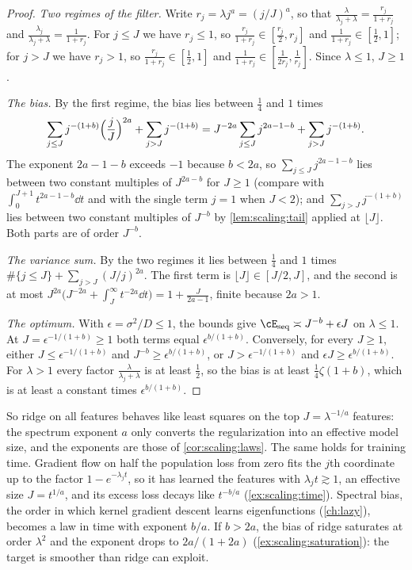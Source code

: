\begin{refsection}
\begin{proof}
\emph{Two regimes of the filter.} Write $r_j=\lambda j^a=(j/J)^a$, so that $\frac\lambda{\lambda_j+\lambda}=\frac{r_j}{1+r_j}$ and $\frac{\lambda_j}{\lambda_j+\lambda}=\frac1{1+r_j}$. For $j\le J$ we have $r_j\le1$, so $\frac{r_j}{1+r_j}\in[\frac{r_j}2,r_j]$ and $\frac1{1+r_j}\in[\frac12,1]$; for $j>J$ we have $r_j>1$, so $\frac{r_j}{1+r_j}\in[\frac12,1]$ and $\frac1{1+r_j}\in[\frac1{2r_j},\frac1{r_j}]$. Since $\lambda\le1$, $J\ge1$.

\emph{The bias.} By the first regime, the bias lies between $\frac14$ and $1$ times
\[
  \sum_{j\le J}j^{-(1+b)}\Bigl(\frac jJ\Bigr)^{2a}+\sum_{j>J}j^{-(1+b)}=J^{-2a}\sum_{j\le J}j^{2a-1-b}+\sum_{j>J}j^{-(1+b)} .
\]
The exponent $2a-1-b$ exceeds $-1$ because $b<2a$, so $\sum_{j\le J}j^{2a-1-b}$ lies between two constant multiples of $J^{2a-b}$ for $J\ge1$ (compare with $\int_0^{J+1}t^{2a-1-b}\dd t$ and with the single term $j=1$ when $J<2$); and $\sum_{j>J}j^{-(1+b)}$ lies between two constant multiples of $J^{-b}$ by \cref{lem:scaling:tail} applied at $\lfloor J\rfloor$. Both parts are of order $J^{-b}$.

\emph{The variance sum.} By the two regimes it lies between $\frac14$ and $1$ times $\#\{j\le J\}+\sum_{j>J}(J/j)^{2a}$. The first term is $\lfloor J\rfloor\in[J/2,J]$, and the second is at most $J^{2a}\bigl(J^{-2a}+\int_J^\infty t^{-2a}\dd t\bigr)=1+\frac J{2a-1}$, finite because $2a>1$.

\emph{The optimum.} With $\epsilon=\sigma^2/D\le1$, the bounds give $\cE_{\mathrm{seq}}\asymp J^{-b}+\epsilon J$ on $\lambda\le1$. At $J=\epsilon^{-1/(1+b)}\ge1$ both terms equal $\epsilon^{b/(1+b)}$. Conversely, for every $J\ge1$, either $J\le\epsilon^{-1/(1+b)}$ and $J^{-b}\ge\epsilon^{b/(1+b)}$, or $J>\epsilon^{-1/(1+b)}$ and $\epsilon J\ge\epsilon^{b/(1+b)}$. For $\lambda>1$ every factor $\frac\lambda{\lambda_j+\lambda}$ is at least $\frac12$, so the bias is at least $\frac14\zeta(1+b)$, which is at least a constant times $\epsilon^{b/(1+b)}$.
\end{proof}

So ridge on all features behaves like least squares on the top $J=\lambda^{-1/a}$ features: the spectrum exponent $a$ only converts the regularization into an effective model size, and the exponents are those of \cref{cor:scaling:laws}. The same holds for training time. Gradient flow on half the population loss from zero fits the $j$th coordinate up to the factor $1-e^{-\lambda_jt}$, so it has learned the features with $\lambda_jt\gtrsim1$, an effective size $J=t^{1/a}$, and its excess loss decays like $t^{-b/a}$ (\cref{ex:scaling:time}). Spectral bias, the order in which kernel gradient descent learns eigenfunctions (\cref{ch:lazy}), becomes a law in time with exponent $b/a$. If $b>2a$, the bias of ridge saturates at order $\lambda^2$ and the exponent drops to $2a/(1+2a)$ (\cref{ex:scaling:saturation}): the target is smoother than ridge can exploit.


\end{refsection}
